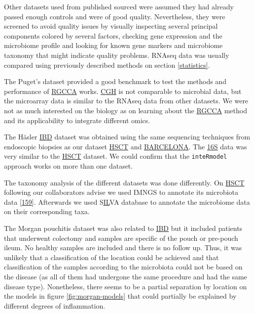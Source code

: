 \documentclass[
  12pt,
  a4paper,
  twoside,
  openright]{book}
\begin{document}
Other datasets used from published sourced were assumed they had already passed enough controls and were of good quality.
Nevertheless, they were screened to avoid quality issues by visually inspecting several principal components colored by several factors, checking gene expression and the microbiome profile and looking for known gene markers and microbiome taxonomy that might indicate quality problems.
RNAseq data was usually compared using previously described methods on section \ref{statistics}.

The Puget's dataset provided a good benchmark to test the methods and performance of \protect\hyperlink{acronyms_RGCCA}{RGCCA} works.
\protect\hyperlink{acronyms_CGH}{CGH} is not comparable to microbial data, but the microarray data is similar to the RNAseq data from other datasets.
We were not as much interested on the biology as on learning about the \protect\hyperlink{acronyms_RGCCA}{RGCCA} method and its applicability to integrate different omics.

The Häsler \protect\hyperlink{acronyms_IBD}{IBD} dataset was obtained using the same sequencing techniques from endoscopic biopsies as our dataset \protect\hyperlink{acronyms_HSCT}{HSCT} and \protect\hyperlink{acronyms_BARCELONA}{BARCELONA}.
The \protect\hyperlink{acronyms_16S}{16S} data was very similar to the \protect\hyperlink{acronyms_HSCT}{HSCT} dataset.
We could confirm that the \texttt{inteRmodel} approach works on more than one dataset.

The taxonomy analysis of the different datasets was done differently.
On \protect\hyperlink{acronyms_HSCT}{HSCT} following our collaborators advise we used IMNGS to annotate its microbiota data {[}\protect\hyperlink{ref-lagkouvardos2016}{159}{]}.
Afterwards we used S\protect\hyperlink{acronyms_IL}{IL}VA database to annotate the microbiome data on their corresponding taxa.

The Morgan pouchitis dataset was also related to \protect\hyperlink{acronyms_IBD}{IBD} but it included patients that underwent colectomy and samples are specific of the pouch or pre-pouch ileum.
No healthy samples are included and there is no follow up.
Thus, it was unlikely that a classification of the location could be achieved and that classification of the samples according to the microbiota could not be based on the disease (as all of them had undergone the same procedure and had the same disease type).
Nonetheless, there seems to be a partial separation by location on the models in figure \ref{fig:morgan-models} that could partially be explained by different degrees of inflammation.
\end{document}

